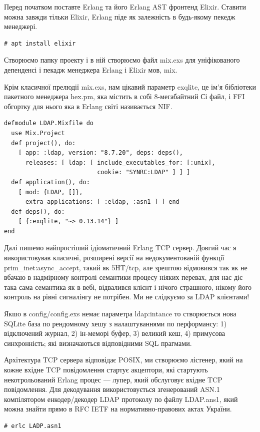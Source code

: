 Перед початком поставте Erlang та його Erlang AST фронтенд Elixir. Ставити можна завжди тільки Elixir, Erlang піде як залежність в будь-якому пекедж менеджері.

\begin{lstlisting}
# apt install elixir
\end{lstlisting}

Створюємо папку проекту і в ній створюємо файл mix.exs для уніфікованого депенденсі і пекадж менеджера Erlang і Elixir мов, mix.

Крім класичної прелюдії mix.exs, нам цікавий параметр exqlite, це ім'я бібліотеки пакетного менеджера hex.pm, яка містить в собі 8-мегабайтний Сі файл, і FFI обгортку для нього яка в Erlang світі називається NIF.

\begin{lstlisting}
defmodule LDAP.Mixfile do
  use Mix.Project
  def project(), do:
    [ app: :ldap, version: "8.7.20", deps: deps(),
      releases: [ ldap: [ include_executables_for: [:unix],
                          cookie: "SYNRC:LDAP" ] ] ]
  def application(), do:
    [ mod: {LDAP, []},
      extra_applications: [ :eldap, :asn1 ] ] end
  def deps(), do:
    [ {:exqlite, "~> 0.13.14"} ]
end
\end{lstlisting}

Далі пишемо найпростіший ідіоматичний Erlang TCP сервер. Довгий час я використовував класичні, розширені версії на недокументованій функції prim\_inet:async\_accept, такий як 5HT/tcp, але зрештою відмовився так як не вбачаю в надмірному контролі семантики процесу ніяких перевах, для нас діє така сама семантика як в вебі, відвалився клієнт і нічого страшного, нікому його контроль на рівні сигналінгу не потрібен. Ми не слідкуємо за LDAP клієнтами!

Якшо в config/config.exs немає параметра ldap:intance то створюється нова SQLite база по рендомному хешу з налаштуваннями по перформансу: 1) відключений журнал, 2) ін-меморі буфер, 3) великий кеш, 4) примусова синхронність; які визначаються відповідними SQL прагмами.

Архітектура TCP сервера відповідає POSIX, ми створюємо лістенер, який на кожне вхідне TCP повідомлення стартує акцептори, які стартують некотрольований Erlang процес — лупер, який обслуговує вхідне TCP повідомлення. Для декодування використовується згенерований ASN.1 компілятором енкодер/декодер LDAP протоколу по файлу LDAP.ans1, який можна знайти прямо в RFC IETF на нормативно-правових актах України.

\begin{lstlisting}
# erlc LADP.asn1
\end{lstlisting}

